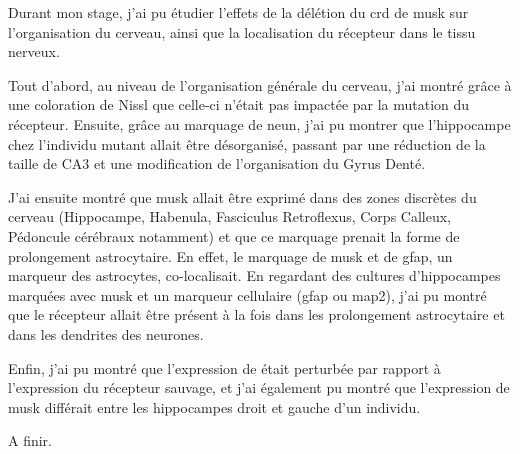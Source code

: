 	Durant mon stage, j'ai pu étudier l'effets de la délétion du \gls{crd} de \gls{musk} sur l'organisation du cerveau, ainsi que la localisation du récepteur dans le tissu nerveux.
	
	Tout d'abord, au niveau de l'organisation générale du cerveau, j'ai montré grâce à une coloration de Nissl que celle-ci n'était pas impactée par la mutation du récepteur. Ensuite, grâce au marquage de \gls{neun}, j'ai pu montrer que l'hippocampe chez l'individu mutant allait être désorganisé, passant par une réduction de la taille de CA3 et une modification de l'organisation du Gyrus Denté.
	
	J'ai ensuite montré que \gls{musk} allait être exprimé dans des zones discrètes du cerveau (Hippocampe, Habenula, Fasciculus Retroflexus, Corps Calleux, Pédoncule cérébraux notamment) et que ce marquage prenait la forme de prolongement astrocytaire. En effet, le marquage de \gls{musk} et de \gls{gfap}, un marqueur des astrocytes, co-localisait. En regardant des cultures d'hippocampes marquées avec \gls{musk} et un marqueur cellulaire (\gls{gfap} ou \gls{map2}), j'ai pu montré que le récepteur allait être présent à la fois dans les prolongement astrocytaire et dans les dendrites des neurones.
	
	Enfin, j'ai pu montré que l'expression de \mcrd était perturbée par rapport à l'expression du récepteur sauvage, et j'ai également pu montré que l'expression de \gls{musk} différait entre les hippocampes droit et gauche d'un individu.
	
	
	A finir.
	
	